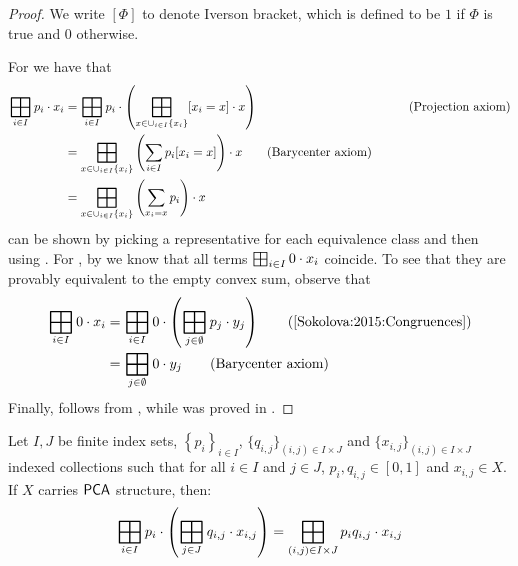 \begin{proof}
    We write $[\Phi]$ to denote Iverson bracket, which is defined to be $1$ if $\Phi$ is true and $0$ otherwise.
    
    For  we have that
    \begin{align*}
        \bigboxplus_{i \in I} p_i \cdot x_i &= \bigboxplus_{i \in I} p_i \cdot \left( \bigboxplus_{x \in \cup_{i \in I} \{x_i\}} [x_i = x] \cdot  x \right) &\tag{Projection axiom}\\
        &= \bigboxplus_{x \in \cup_{i \in I} \{x_i\}} \left( \sum_{i \in I} p_i[x_i = x] \right) \cdot x \tag{Barycenter axiom} \\
        &=  \bigboxplus_{x \in \cup_{i \in I} \{x_i\} } \left(\sum_{x_i = x} p_i\right) \cdot x
    \end{align*}
     can be shown by picking a representative for each equivalence class and then using . For , by \cite[Lemma~3.4]{Sokolova:2015:Congruences} we know that all terms $\bigboxplus_{i \in I} 0 \cdot x_i$ coincide. To see that they are provably equivalent to the empty convex sum, observe that
    \begin{align*}
        \bigboxplus_{i \in I} 0 \cdot x_i &= \bigboxplus_{i \in I} 0 \cdot \left(\bigboxplus_{j \in \emptyset} p_j \cdot y_j\right)\tag{\cite[Lemma~3.4]{Sokolova:2015:Congruences}}\\
        &= \bigboxplus_{j \in \emptyset} 0 \cdot y_j \tag{Barycenter axiom}\\
    \end{align*}
    Finally,  follows from \cite[Lemma~3.4]{Sokolova:2015:Congruences}, while  was proved in \cite[Proposition~3.1]{Doberkat:2008:Erratum}.
\end{proof}
\begin{lemma}\label{lem:flattening_convex_sums}
    Let $I, J$ be finite index sets, $\left\{p_i\right\}_{i \in I}$, $\{q_{i,j}\}_{(i,j) \in I\times J}$ and $\{x_{i,j}\}_{(i,j) \in I \times J}$ indexed collections such that for all $i \in I$ and $j \in J$, $p_i, q_{i,j} \in [0,1]$ and $x_{i,j} \in X$. If $X$ carries ${\mathsf{PCA}}$ structure, then:
    $$\bigboxplus_{i \in I} p_i \cdot \left(\bigboxplus_{j \in J} q_{i,j} \cdot x_{i,j}\right) = \bigboxplus_{(i,j) \in I \times J} p_iq_{i,j} \cdot x_{i,j}$$
\end{lemma}
